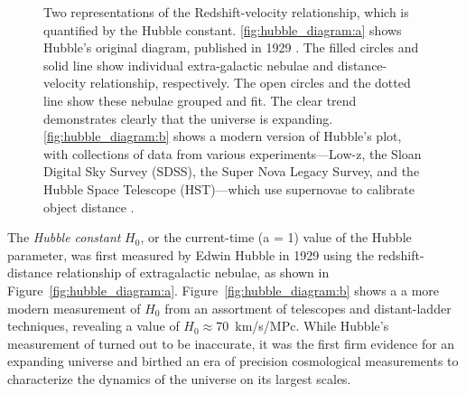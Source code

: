 \begin{figure}
    \caption[The original Hubble diagram and a modern version of it]{Two representations of the Redshift-velocity relationship, which is quantified by the Hubble constant. \ref{fig:hubble_diagram:a} shows Hubble's original diagram, published in 1929 \cite{hubble_relation_1929}. The filled circles and solid line show individual extra-galactic nebulae and distance-velocity relationship, respectively. The open circles and the dotted line show these nebulae grouped and fit. The clear trend demonstrates clearly that the universe is expanding. \ref{fig:hubble_diagram:b} shows a modern version of Hubble's plot, with collections of data from various experiments---Low-z, the Sloan Digital Sky Survey (SDSS), the Super Nova Legacy Survey, and the Hubble Space Telescope (HST)---which use supernovae to calibrate object distance \cite{bahcall_hubble_2015}.}
    \label{fig:hubble_diagram}
\end{figure}

The \textit{Hubble constant} $H_{0}$, or the current-time (a = 1) value of the Hubble parameter, was first measured by Edwin Hubble in 1929 using the redshift-distance relationship of extragalactic nebulae, as shown in Figure~\ref{fig:hubble_diagram:a}. Figure~\ref{fig:hubble_diagram:b} shows a a more modern measurement of $H_{0}$ from an assortment of telescopes and distant-ladder techniques, revealing a value of $H_{0} \approx 70$~km/s/MPc. While Hubble's measurement of turned out to be inaccurate, it was the first firm evidence for an expanding universe and birthed an era of precision cosmological measurements to characterize the dynamics of the universe on its largest scales.

